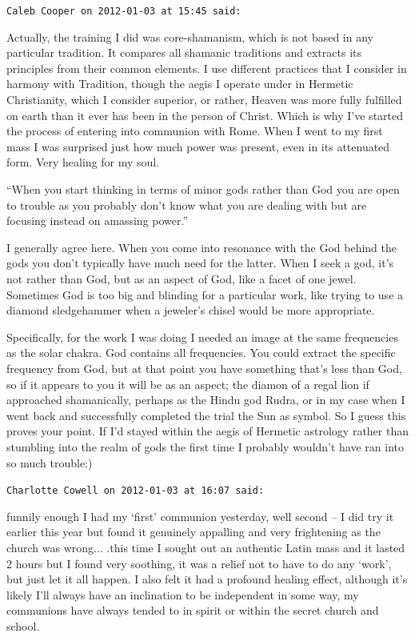 \begin{footnotesize}
\begin{sffamily}
\hfill

\texttt{Caleb Cooper on 2012-01-03 at 15:45 said:}

Actually, the training I did was core-shamanism, which is not based in any particular tradition. It compares all shamanic traditions and extracts its principles from their common elements. I use different practices that I consider in harmony with Tradition, though the aegis I operate under in Hermetic Christianity, which I consider superior, or rather, Heaven was more fully fulfilled on earth than it ever has been in the person of Christ. Which is why I've started the process of entering into communion with Rome. When I went to my first mass I was surprised just how much power was present, even in its attenuated form. Very healing for my soul.

``When you start thinking in terms of minor gods rather than God you are open to trouble as you probably don't know what you are dealing with but are focusing instead on amassing power.''

I generally agree here. When you come into resonance with the God behind the gods you don't typically have much need for the latter. When I seek a god, it's not rather than God, but as an aspect of God, like a facet of one jewel. Sometimes God is too big and blinding for a particular work, like trying to use a diamond sledgehammer when a jeweler's chisel would be more appropriate.

Specifically, for the work I was doing I needed an image at the same frequencies as the solar chakra. God contains all frequencies. You could extract the specific frequency from God, but at that point you have something that's less than God, so if it appears to you it will be as an aspect; the diamon of a regal lion if approached shamanically, perhaps as the Hindu god Rudra, or in my case when I went back and successfully completed the trial the Sun as symbol. So I guess this proves your point. If I'd stayed within the aegis of Hermetic astrology rather than stumbling into the realm of gods the first time I probably wouldn't have ran into so much trouble:)

\hfill

\texttt{Charlotte Cowell on 2012-01-03 at 16:07 said:}

funnily enough I had my `first' communion yesterday, well second -- I did try it earlier this year but found it genuinely appalling and very frightening as the church was wrong... .this time I sought out an authentic Latin mass and it lasted 2 hours but I found very soothing, it was a relief not to have to do any `work', but just let it all happen. I also felt it had a profound healing effect, although it's likely I'll always have an inclination to be independent in some way, my communions have always tended to in spirit or within the secret church and school.


\end{sffamily}
\end{footnotesize}
